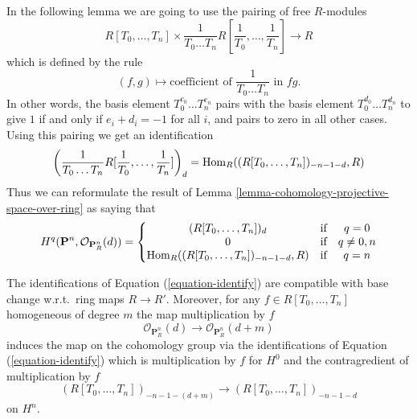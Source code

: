 \noindent
In the following lemma we are going to use the pairing of free
$R$-modules
$$
R[T_0, \ldots, T_n]
\times
\frac{1}{T_0 \ldots T_n} R[\frac{1}{T_0}, \ldots, \frac{1}{T_n}]
\longrightarrow
R
$$
which is defined by the rule
$$
(f, g)
\longmapsto
\text{coefficient of }
\frac{1}{T_0 \ldots T_n}
\text{ in }fg.
$$
In other words, the basis element $T_0^{e_0} \ldots T_n^{e_n}$ pairs
with the basis element $T_0^{d_0} \ldots T_n^{d_n}$ to give $1$ if and only
if $e_i + d_i = -1$ for all $i$, and pairs to zero in all other cases.
Using this pairing we get an identification
$$
\left(\frac{1}{T_0 \ldots T_n} R[\frac{1}{T_0}, \ldots, \frac{1}{T_n}]\right)_d
=
\mathop{\mathrm{Hom}}\nolimits_R((R[T_0, \ldots, T_n])_{-n - 1 - d}, R)
$$
Thus we can reformulate the result of
Lemma \ref{lemma-cohomology-projective-space-over-ring} as saying that
\begin{equation}
\label{equation-identify}
H^q(\mathbf{P}^n, \mathcal{O}_{\mathbf{P}^n_R}(d)) =
\left\{
\begin{matrix}
(R[T_0, \ldots, T_n])_d & \text{if} & q = 0 \\
0 & \text{if} & q \not = 0, n \\
\mathop{\mathrm{Hom}}\nolimits_R((R[T_0, \ldots, T_n])_{-n - 1 - d}, R)
& \text{if} & q = n
\end{matrix}
\right.
\end{equation}

\begin{lemma}
\label{lemma-identify-functorially}
The identifications of Equation (\ref{equation-identify}) are
compatible with base change w.r.t.\ ring maps $R \to R'$.
Moreover, for any $f \in R[T_0, \ldots, T_n]$ homogeneous
of degree $m$ the map multiplication by $f$
$$
\mathcal{O}_{\mathbf{P}^n_R}(d)
\longrightarrow
\mathcal{O}_{\mathbf{P}^n_R}(d + m)
$$
induces the map on the cohomology group via the identifications
of Equation (\ref{equation-identify}) which is multiplication by
$f$ for $H^0$ and the contragredient of multiplication by $f$
$$
(R[T_0, \ldots, T_n])_{-n - 1 - (d + m)}
\longrightarrow
(R[T_0, \ldots, T_n])_{-n - 1 - d}
$$
on $H^n$.
\end{lemma}

